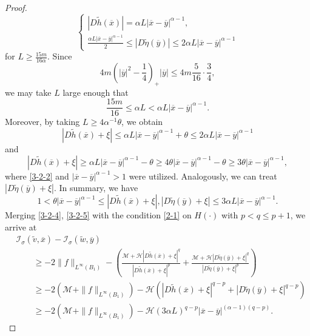 \documentclass[11pt,reqno]{amsart}
\numberwithin{equation}{section}
\begin{document}
\begin{proof}
\begin{equation*}
\begin{cases}
|D\widetilde{h}(\overline{x})|=\alpha L|\overline{x}-\overline{y}|^{\alpha-1}, \\
\frac{\alpha L|\overline{x}-\overline{y}|^{\alpha-1}}{2}\le|D\widetilde{\eta}(\overline{y})|\le2\alpha L|\overline{x}-\overline{y}|^{\alpha-1}
\end{cases}
\end{equation*}
for $L\ge\frac{15m}{16\alpha}$. Since
$$
4m\left(|\overline{y}|^2-\frac{1}{4}\right)_+|\overline{y}|\le 4m\frac{5}{16}\cdot\frac{3}{4},$$
we may take $L$ large enough that
$$
\frac{15m}{16}\le\alpha L<\alpha L|\overline{x}-\overline{y}|^{\alpha-1}.
$$
Moreover, by taking $L\ge4\alpha^{-1}\theta$, we obtain
$$
|D\widetilde{h}(\overline{x})+\xi|\le\alpha L|\overline{x}-\overline{y}|^{\alpha-1}+\theta\le 2\alpha L|\overline{x}-\overline{y}|^{\alpha-1}
$$
and
$$
|D\widetilde{h}(\overline{x})+\xi|\ge\alpha L|\overline{x}-\overline{y}|^{\alpha-1}-\theta\ge4\theta|\overline{x}-\overline{y}|^{\alpha-1}-\theta\ge3\theta|\overline{x}-\overline{y}|^{\alpha-1},
$$
where \eqref{3-2-2} and $|\overline{x}-\overline{y}|^{\alpha-1}>1$ were utilized. Analogously, we can treat $|D\widetilde{\eta}(\overline{y})+\xi|$. In summary, we have
\begin{equation}
\label{3-2-5}
1<\theta|\overline{x}-\overline{y}|^{\alpha-1}\le|D\widetilde{h}(\overline{x})+\xi|,|D\widetilde{\eta}(\overline{y})+\xi|\le3\alpha L|\overline{x}-\overline{y}|^{\alpha-1}.
\end{equation}
Merging \eqref{3-2-4}, \eqref{3-2-5} with the condition \eqref{2-1} on $H(\cdot)$ with $p<q\le p+1$, we arrive at
\begin{equation}
\label{3-2-6}
\begin{split}
&\mathcal{I}_\sigma(\widetilde{v},\overline{x})-\mathcal{I}_\sigma(\widetilde{w},\overline{y}) \\
&\qquad\ge-2\|f\|_{L^\infty(B_1)}-\left(\frac{\mathcal{M}+\mathcal{H}|D\widetilde{h}(\overline{x})+\xi|^q}{|D\widetilde{h}(\overline{x})+\xi|^p}+
\frac{\mathcal{M}+\mathcal{H}|D\widetilde{\eta}(\overline{y})+\xi|^q}{|D\widetilde{\eta}(\overline{y})+\xi|^p}\right) \\
&\qquad\ge-2(\mathcal{M}+\|f\|_{L^\infty(B_1)})-\mathcal{H}\left(|D\widetilde{h}(\overline{x})+\xi|^{q-p}+|D\widetilde{\eta}(\overline{y})+\xi|^{q-p}\right) \\
&\qquad\ge-2(\mathcal{M}+\|f\|_{L^\infty(B_1)})-\mathcal{H}(3\alpha L)^{q-p}|\overline{x}-\overline{y}|^{(\alpha-1)(q-p)}.
\end{split}
\end{equation}


\end{proof}
\end{document}
